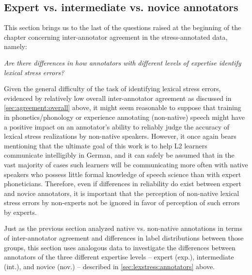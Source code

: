 		
		\subsection{Expert vs. intermediate vs. novice annotators}
		\label{sec:agreement:expert}
		
		
		
	This section brings us to the last of the questions raised at the beginning of the chapter concerning inter-annotator agreement in the stress-annotated data, namely:
	
	\textit{Are there differences in how 
	annotators with different levels of expertise
	identify lexical stress errors?}
	
	Given the general difficulty of the task of identifying lexical stress errors, evidenced by relatively low overall inter-annotator agreement as discussed in \cref{sec:agreement:overall} above, it might seem reasonable to suppose that training in phonetics/phonology or experience annotating (non-native) speech might have a positive impact on an annotator's ability to reliably judge the accuracy of lexical stress realizations by non-native speakers. However, it once again bears mentioning that the ultimate goal of this work is to help L2 learners communicate intelligibly in German, and it can safely be assumed that in the vast majority of cases such learners will be communicating more often with native speakers who possess little formal knowledge of speech science than with expert phoneticians. Therefore, even if differences in reliability do exist between expert and novice annotators, it is important that the perception of non-native lexical stress errors by non-experts not be ignored in favor of perception of such errors by experts. 
	

	
	Just as the previous section analyzed native vs. non-native annotations in terms of inter-annotator agreement and differences in label distributions between those groups, this section uses analogous data to investigate the differences between annotators of the three different expertise levels -- expert (exp.), intermediate (int.), and novice (nov.) -- described in \cref{sec:lexstress:annotators} above.
	
